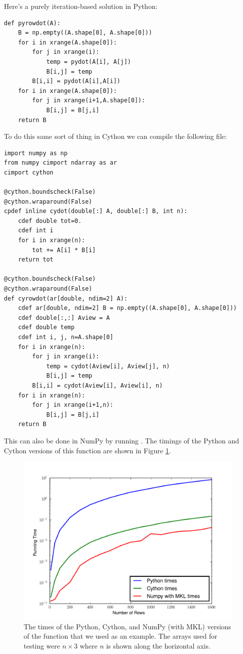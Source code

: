 Here's a purely iteration-based solution in Python:
\begin{lstlisting}
def pyrowdot(A):
    B = np.empty((A.shape[0], A.shape[0]))
    for i in xrange(A.shape[0]):
        for j in xrange(i):
            temp = pydot(A[i], A[j])
            B[i,j] = temp
        B[i,i] = pydot(A[i],A[i])
    for i in xrange(A.shape[0]):
        for j in xrange(i+1,A.shape[0]):
            B[i,j] = B[j,i]
    return B
\end{lstlisting}

To do this same sort of thing in Cython we can compile the following file:

\begin{lstlisting}
import numpy as np
from numpy cimport ndarray as ar
cimport cython

@cython.boundscheck(False)
@cython.wraparound(False)
cpdef inline cydot(double[:] A, double[:] B, int n):
    cdef double tot=0.
    cdef int i
    for i in xrange(n):
        tot += A[i] * B[i]
    return tot

@cython.boundscheck(False)
@cython.wraparound(False)
def cyrowdot(ar[double, ndim=2] A):
    cdef ar[double, ndim=2] B = np.empty((A.shape[0], A.shape[0]))
    cdef double[:,:] Aview = A
    cdef double temp
    cdef int i, j, n=A.shape[0]
    for i in xrange(n):
        for j in xrange(i):
            temp = cydot(Aview[i], Aview[j], n)
            B[i,j] = temp
        B[i,i] = cydot(Aview[i], Aview[i], n)
    for i in xrange(n):
        for j in xrange(i+1,n):
            B[i,j] = B[j,i]
    return B
\end{lstlisting}

This can also be done in NumPy by running .
The timings of the Python and Cython versions of this function are shown in Figure \ref{cython:rowdot}.

\begin{figure}
\centering
\includegraphics[width=\textwidth]{rowdot.pdf}
\caption{
The times of the Python, Cython, and NumPy (with MKL) versions of the  function that we used as an example.
The arrays used for testing were $n\times 3$ where $n$ is shown along the horizontal axis.
}
\label{cython:rowdot}
\end{figure}

